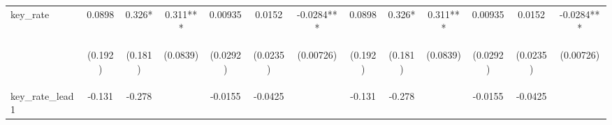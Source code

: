 \documentclass[]{article}
\begin{document}
\begin{center}
\begin{tabular}{lcccccccccccc}
key\_rate & 0.0898 & 0.326* & 0.311*** & 0.00935 & 0.0152 & -0.0284*** & 0.0898 & 0.326* & 0.311*** & 0.00935 & 0.0152 & -0.0284*** \\
\vspace{4pt} & \begin{footnotesize}(0.192)\end{footnotesize} & \begin{footnotesize}(0.181)\end{footnotesize} & \begin{footnotesize}(0.0839)\end{footnotesize} & \begin{footnotesize}(0.0292)\end{footnotesize} & \begin{footnotesize}(0.0235)\end{footnotesize} & \begin{footnotesize}(0.00726)\end{footnotesize} & \begin{footnotesize}(0.192)\end{footnotesize} & \begin{footnotesize}(0.181)\end{footnotesize} & \begin{footnotesize}(0.0839)\end{footnotesize} & \begin{footnotesize}(0.0292)\end{footnotesize} & \begin{footnotesize}(0.0235)\end{footnotesize} & \begin{footnotesize}(0.00726)\end{footnotesize} \\
key\_rate\_lead1 & -0.131 & -0.278 &  & -0.0155 & -0.0425 &  & -0.131 & -0.278 &  & -0.0155 & -0.0425 &  \\

\end{tabular}
\end{center}
\end{document}
